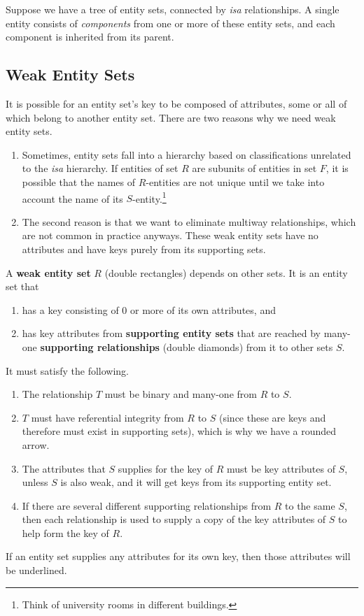   Suppose we have a tree of entity sets, connected by \textit{isa} relationships. A single entity consists of \textit{components} from one or more of these entity sets, and each component is inherited from its parent. 

\subsection{Weak Entity Sets}

  It is possible for an entity set's key to be composed of attributes, some or all of which belong to another entity set. There are two reasons why we need weak entity sets. 
  \begin{enumerate}
    \item Sometimes, entity sets fall into a hierarchy based on classifications unrelated to the \textit{isa} hierarchy. If entities of set $R$ are subunits of entities in set $F$, it is possible that the names of $R$-entities are not unique until we take into account the name of its $S$-entity.\footnote{Think of university rooms in different buildings.}
    \item The second reason is that we want to eliminate multiway relationships, which are not common in practice anyways. These weak entity sets have no attributes and have keys purely from its supporting sets. 
  \end{enumerate}

  \begin{definition}
    \label{def:weak-entity-set}
    A \textbf{weak entity set} $R$ (double rectangles) depends on other sets. It is an entity set that 
    \begin{enumerate}
      \item has a key consisting of 0 or more of its own attributes, and 
      \item has key attributes from \textbf{supporting entity sets} that are reached by many-one \textbf{supporting relationships} (double diamonds) from it to other sets $S$. 
    \end{enumerate}
    It must satisfy the following. 
    \begin{enumerate}
      \item The relationship $T$ must be binary and many-one from $R$ to $S$. 
      \item $T$ must have referential integrity from $R$ to $S$ (since these are keys and therefore must exist in supporting sets), which is why we have a rounded arrow. 
      \item The attributes that $S$ supplies for the key of $R$ must be key attributes of $S$, unless $S$ is also weak, and it will get keys from its supporting entity set. 
      \item If there are several different supporting relationships from $R$ to the same $S$, then each relationship is used to supply a copy of the key attributes of $S$ to help form the key of $R$. 
    \end{enumerate}
    If an entity set supplies any attributes for its own key, then those attributes will be underlined. 
  \end{definition}

